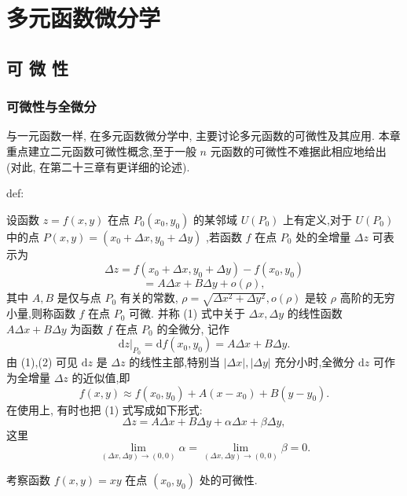 \chapter{多元函数微分学}

\section{可 微 性}

\subsection{可微性与全微分}

与一元函数一样, 在多元函数微分学中, 主要讨论多元函数的可微性及其应用. 本章重点建立二元函数可微性概念,至于一般 \(n\) 元函数的可微性不难据此相应地给出 (对此, 在第二十三章有更详细的论述).

\begin{definition}{}{def:}

\end{definition}
设函数 \(z = f\left( {x,y}\right)\) 在点 \({P}_{0}\left( {{x}_{0},{y}_{0}}\right)\) 的某邻域 \(U\left( {P}_{0}\right)\) 上有定义,对于 \(U\left( {P}_{0}\right)\) 中的点 \(P\left( {x,y}\right)  = \left( {{x}_{0} + {\Delta x},{y}_{0} + {\Delta y}}\right)\) ,若函数 \(f\) 在点 \({P}_{0}\) 处的全增量 \({\Delta z}\) 可表示为
\[
{\Delta z} = f\left( {{x}_{0} + {\Delta x},{y}_{0} + {\Delta y}}\right)  - f\left( {{x}_{0},{y}_{0}}\right)
\]
\[
= {A\Delta x} + {B\Delta y} + o\left( \rho \right) , \tag{1}
\]
其中 \(A,B\) 是仅与点 \({P}_{0}\) 有关的常数, \(\rho  = \sqrt{\Delta {x}^{2} + \Delta {y}^{2}},o\left( \rho \right)\) 是较 \(\rho\) 高阶的无穷小量,则称函数 \(f\) 在点 \({P}_{0}\) 可微. 并称 (1) 式中关于 \({\Delta x},{\Delta y}\) 的线性函数 \({A\Delta x} + {B\Delta y}\) 为函数 \(f\) 在点 \({P}_{0}\) 的全微分, 记作
\[
{\left. \mathrm{d}z\right| }_{{P}_{0}} = \mathrm{d}f\left( {{x}_{0},{y}_{0}}\right)  = {A\Delta x} + {B\Delta y}. \tag{2}
\]
由 (1),(2) 可见 \(\mathrm{d}z\) 是 \({\Delta z}\) 的线性主部,特别当 \(\left| {\Delta x}\right| ,\left| {\Delta y}\right|\) 充分小时,全微分 \(\mathrm{d}z\) 可作为全增量 \({\Delta z}\) 的近似值,即
\[
f\left( {x,y}\right)  \approx  f\left( {{x}_{0},{y}_{0}}\right)  + A\left( {x - {x}_{0}}\right)  + B\left( {y - {y}_{0}}\right) . \tag{3}
\]
在使用上, 有时也把 (1) 式写成如下形式:
\[
{\Delta z} = {A\Delta x} + {B\Delta y} + {\alpha \Delta x} + {\beta \Delta y}, \tag{4}
\]
这里
\[
\mathop{\lim }\limits_{{\left( {{\Delta x},{\Delta y}}\right)  \rightarrow  \left( {0,0}\right) }}\alpha  = \mathop{\lim }\limits_{{\left( {{\Delta x},{\Delta y}}\right)  \rightarrow  \left( {0,0}\right) }}\beta  = 0.
\]
\begin{example}

\end{example}
考察函数 \(f\left( {x,y}\right)  = {xy}\) 在点 \(\left( {{x}_{0},{y}_{0}}\right)\) 处的可微性.

